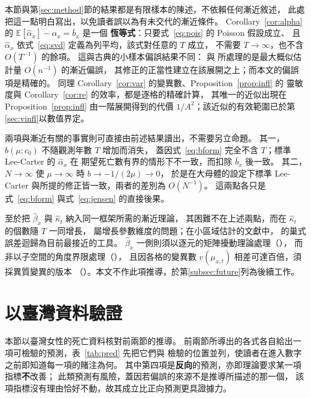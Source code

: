 \documentclass[UTF8, fontset=macnew, a4paper, 12pt]{ctexart}
\newcommand{\Ex}{\mathbb{E}}
\begin{document}
本節與第\ref{sec:method}節的結果都是有限樣本的陳述，不依賴任何漸近敘述，
此處把這一點明白寫出，以免讀者誤以為有未交代的漸近條件。
Corollary~\ref{cor:alpha} 的 $\Ex[\hat\alpha_x]-\alpha_x=\bar b_x$ 是一個
\textbf{恆等式}：只要式~\eqref{eq:pois} 的 Poisson 假設成立、
且 $\hat\alpha_x$ 依式~\eqref{eq:svd} 定義為列平均，該式對任意的 $T$ 成立，
不需要 $T\to\infty$，也不含 $O(T^{-1})$ 的餘項。
這與古典的小樣本偏誤結果不同：\citet{coxsnell1968} 與 \citet{firth1993}
所處理的是最大概似估計量 $O(n^{-1})$ 的漸近偏誤，
其修正的正當性建立在該展開之上；而本文的偏誤項是精確的。
同理 Corollary~\ref{cor:var} 的變異數、Proposition~\ref{prop:infl} 的
靈敏度與 Corollary~\ref{cor:re} 的效率，都是逐格的精確計算，
其唯一的近似出現在 Proposition~\ref{prop:infl} 由一階展開得到的代價
$1/A^2$；該近似的有效範圍已於第\ref{sec:vinfl}以數值界定。

兩項與漸近有關的事實則可直接由前述結果讀出，不需要另立命題。
其一，$b(\mu;c_0)$ 不隨觀測年數 $T$ 增加而消失，
蓋因式~\eqref{eq:bform} 完全不含 $T$；標準 Lee-Carter 的 $\hat\alpha_x$ 在
期望死亡數有界的情形下不一致，而扣除 $\bar b_x$ 後一致。
其二，$N\to\infty$ 使 $\mu\to\infty$ 時 $b\to-1/(2\mu)\to0$，
於是在大母體的設定下標準 Lee-Carter 與所提的修正皆一致，兩者的差別為 $O(N^{-1})$。
這兩點各只是式~\eqref{eq:bform} 與式~\eqref{eq:jensen} 的直接後果。

至於把 $\hat\beta_x$ 與 $\hat\kappa_t$ 納入同一框架所需的漸近理論，
其困難不在上述兩點，而在 $\hat\kappa_t$ 的個數隨 $T$ 一同增長，
屬增長參數維度的問題；在小區域估計的文獻中，
\citet{lahiri2023} 的巢式誤差迴歸為目前最接近的工具。
$\hat\beta_x$ 一側則須以逐元的矩陣擾動理論處理（\citealp{abbe2020}），
而非以子空間的角度界限處理（\citealp{caizhang2018}），
且因各格的變異數 $v(\mu_{x,t})$ 相差可達百倍，須採異質變異的版本
（\citealp{zhang2022}）。本文不作此項推導，於第\ref{subsec:future}列為後續工作。

\section{以臺灣資料驗證}\label{sec:valid}

本節以臺灣女性的死亡資料核對前兩節的推導。
前兩節所導出的各式各自給出一項可檢驗的預測，表~\ref{tab:pred} 先把它們與
檢驗的位置並列，使讀者在進入數字之前即知道每一項的賭注為何。
其中第四項是\textbf{反向}的預測，亦即理論要求某一項指標\textbf{不}改善；
此類預測有風險，蓋因若偏誤的來源不是推導所描述的那一個，
該項指標沒有理由恰好不動，故其成立比正向預測更具證據力。
\end{document}
